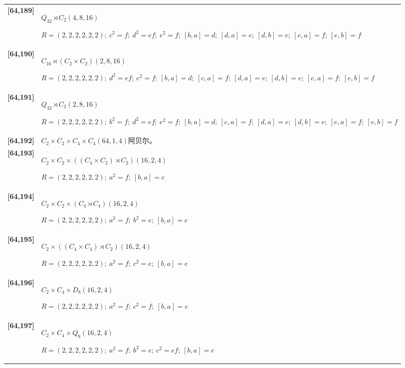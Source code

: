 \documentclass[UTF8,fontset=fandol,11pt,a4paper]{ctexart}
\begin{document}
\begin{longtable}{@{}p{17mm}>{\raggedright\arraybackslash}p{141mm}@{}}
\textbf{[64,189]} & $Q_{32}\rtimes C_{2}$\quad $(4,8,16)$\par\(R=(2,2,2,2,2,2);\allowbreak\ c^{2}=f;\allowbreak\ d^{2}=ef;\allowbreak\ e^{2}=f;\allowbreak\ [b,a]=d;\allowbreak\ [d,a]=e;\allowbreak\ [d,b]=e;\allowbreak\ [e,a]=f;\allowbreak\ [e,b]=f\)\\[3pt]

\textbf{[64,190]} & $C_{16}\rtimes (C_{2}\times C_{2})$\quad $(2,8,16)$\par\(R=(2,2,2,2,2,2);\allowbreak\ d^{2}=ef;\allowbreak\ e^{2}=f;\allowbreak\ [b,a]=d;\allowbreak\ [c,a]=f;\allowbreak\ [d,a]=e;\allowbreak\ [d,b]=e;\allowbreak\ [e,a]=f;\allowbreak\ [e,b]=f\)\\[3pt]

\textbf{[64,191]} & $Q_{32}\rtimes C_{2}$\quad $(2,8,16)$\par\(R=(2,2,2,2,2,2);\allowbreak\ b^{2}=f;\allowbreak\ d^{2}=ef;\allowbreak\ e^{2}=f;\allowbreak\ [b,a]=d;\allowbreak\ [c,a]=f;\allowbreak\ [d,a]=e;\allowbreak\ [d,b]=e;\allowbreak\ [e,a]=f;\allowbreak\ [e,b]=f\)\\[3pt]

\textbf{[64,192]} & $C_{2}\times C_{2}\times C_{4}\times C_{4}$\quad $(64,1,4)$\quad 阿贝尔。\\[3pt]

\textbf{[64,193]} & $C_{2}\times C_{2}\times ((C_{4}\times C_{2})\rtimes C_{2})$\quad $(16,2,4)$\par\(R=(2,2,2,2,2,2);\allowbreak\ a^{2}=f;\allowbreak\ [b,a]=e\)\\[3pt]

\textbf{[64,194]} & $C_{2}\times C_{2}\times (C_{4}\rtimes C_{4})$\quad $(16,2,4)$\par\(R=(2,2,2,2,2,2);\allowbreak\ a^{2}=f;\allowbreak\ b^{2}=e;\allowbreak\ [b,a]=e\)\\[3pt]

\textbf{[64,195]} & $C_{2}\times ((C_{4}\times C_{4})\rtimes C_{2})$\quad $(16,2,4)$\par\(R=(2,2,2,2,2,2);\allowbreak\ a^{2}=f;\allowbreak\ c^{2}=e;\allowbreak\ [b,a]=e\)\\[3pt]

\textbf{[64,196]} & $C_{2}\times C_{4}\times D_{8}$\quad $(16,2,4)$\par\(R=(2,2,2,2,2,2);\allowbreak\ a^{2}=f;\allowbreak\ c^{2}=f;\allowbreak\ [b,a]=e\)\\[3pt]

\textbf{[64,197]} & $C_{2}\times C_{4}\times Q_{8}$\quad $(16,2,4)$\par\(R=(2,2,2,2,2,2);\allowbreak\ a^{2}=f;\allowbreak\ b^{2}=e;\allowbreak\ c^{2}=ef;\allowbreak\ [b,a]=e\)\\[3pt]


\end{longtable}
\end{document}
